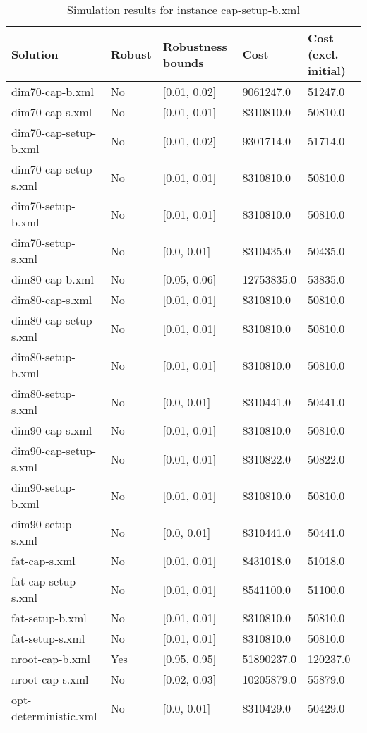 \begin{table}[!hbp]
\label{tab:instance3_results}
\begin{tabular}{lllll}
\hline
Solution 	& Robust  	& Robustness bounds 	& Cost 	& Cost (excl. initial) \\
\hline
\hline
dim70-cap-b.xml 	& No 	&  [0.01, 0.02] 	& 9061247.0 	& 51247.0\\
dim70-cap-s.xml 	& No 	&  [0.01, 0.01] 	& 8310810.0 	& 50810.0\\
dim70-cap-setup-b.xml 	& No 	&  [0.01, 0.02] 	& 9301714.0 	& 51714.0\\
dim70-cap-setup-s.xml 	& No 	&  [0.01, 0.01] 	& 8310810.0 	& 50810.0\\
dim70-setup-b.xml 	& No 	&  [0.01, 0.01] 	& 8310810.0 	& 50810.0\\
dim70-setup-s.xml 	& No 	&  [0.0, 0.01] 	& 8310435.0 	& 50435.0\\
dim80-cap-b.xml 	& No 	&  [0.05, 0.06] 	& 12753835.0 	& 53835.0\\
dim80-cap-s.xml 	& No 	&  [0.01, 0.01] 	& 8310810.0 	& 50810.0\\
dim80-cap-setup-s.xml 	& No 	&  [0.01, 0.01] 	& 8310810.0 	& 50810.0\\
dim80-setup-b.xml 	& No 	&  [0.01, 0.01] 	& 8310810.0 	& 50810.0\\
dim80-setup-s.xml 	& No 	&  [0.0, 0.01] 	& 8310441.0 	& 50441.0\\
dim90-cap-s.xml 	& No 	&  [0.01, 0.01] 	& 8310810.0 	& 50810.0\\
dim90-cap-setup-s.xml 	& No 	&  [0.01, 0.01] 	& 8310822.0 	& 50822.0\\
dim90-setup-b.xml 	& No 	&  [0.01, 0.01] 	& 8310810.0 	& 50810.0\\
dim90-setup-s.xml 	& No 	&  [0.0, 0.01] 	& 8310441.0 	& 50441.0\\
fat-cap-s.xml 	& No 	&  [0.01, 0.01] 	& 8431018.0 	& 51018.0\\
fat-cap-setup-s.xml 	& No 	&  [0.01, 0.01] 	& 8541100.0 	& 51100.0\\
fat-setup-b.xml 	& No 	&  [0.01, 0.01] 	& 8310810.0 	& 50810.0\\
fat-setup-s.xml 	& No 	&  [0.01, 0.01] 	& 8310810.0 	& 50810.0\\
nroot-cap-b.xml 	& Yes 	&  [0.95, 0.95] 	& 51890237.0 	& 120237.0\\
nroot-cap-s.xml 	& No 	&  [0.02, 0.03] 	& 10205879.0 	& 55879.0\\
opt-deterministic.xml 	& No 	&  [0.0, 0.01] 	& 8310429.0 	& 50429.0\\
\hline
\end{tabular}
\caption{Simulation results for instance cap-setup-b.xml}
\end{table}


